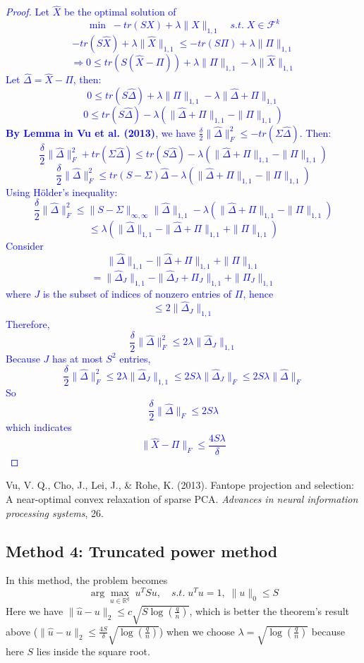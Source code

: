 \documentclass[12pt]{book}
\theoremstyle{definition}
\theoremstyle{remark}
\newcommand{\R}{\mathbb{R}}
\begin{document}
\textcolor{blue}{
\begin{proof}
    Let $\hat{X}$ be the optimal solution of 
    \[\min\; -tr(SX) + \lambda\|X\|_{1,1}\quad s.t. \; X\in \mathcal{F}^k\]
    \[
-tr(S\hat{X}) + \lambda \| \hat{X}\|_{1,1} \leq - tr(S\Pi) + \lambda \| \Pi \|_{1,1}
\]
\[
\Rightarrow 0 \leq tr(S(\hat{X} - \Pi)) + \lambda \| \Pi \|_{1,1} - \lambda \|\hat{X} \|_{1,1}
\]
Let \(\hat{\Delta} = \hat{X} - \Pi\), then:
\[
0 \leq tr(S\hat{\Delta}) + \lambda \| \Pi \|_{1,1} - \lambda \| \hat{\Delta} + \Pi \|_{1,1}
\]
\[
0 \leq tr(S\hat{\Delta}) - \lambda ( \| \hat{\Delta} + \Pi \|_{1,1} - \| \Pi \|_{1,1} )
\]
\textbf{By Lemma in Vu et al. (2013)}, we have $\frac{\delta}{2} \| \hat{\Delta} \|_F^2 \le -tr(\Sigma\hat{\Delta})$. Then:
\[
\frac{\delta}{2} \| \hat{\Delta} \|_F^2 + tr(\Sigma\hat{\Delta}) \leq tr(S\hat{\Delta}) - \lambda ( \| \hat{\Delta} + \Pi \|_{1,1} - \| \Pi \|_{1,1} )
\]
\[
\frac{\delta}{2} \| \hat{\Delta} \|_F^2 \leq tr(S - \Sigma) \hat{\Delta} - \lambda ( \| \hat{\Delta} + \Pi \|_{1,1} - \| \Pi \|_{1,1} )
\]
Using Hölder’s inequality:
\[
\frac{\delta}{2} \| \hat{\Delta} \|_F^2 \leq \| S - \Sigma \|_{\infty, \infty} \| \hat{\Delta} \|_{1,1} - \lambda ( \| \hat{\Delta} + \Pi \|_{1,1} - \| \Pi \|_{1,1} )
\]
\[
\leq \lambda( \| \hat{\Delta} \|_{1,1} - \| \hat{\Delta} + \Pi \|_{1,1} + \| \Pi \|_{1,1} )
\]
Consider
\[
\| \hat{\Delta} \|_{1,1} - \| \hat{\Delta} + \Pi \|_{1,1} + \| \Pi \|_{1,1} \]\[= \| \hat{\Delta}_J \|_{1,1} - \| \hat{\Delta}_J + \Pi_J \|_{1,1} + \| \Pi_J \|_{1,1}
\]
where \( J \) is the subset of indices of nonzero entries of \( \Pi \), hence
\[\le 2\| \hat{\Delta}_J \|_{1,1}\]
Therefore, 
\[\frac{\delta}{2} \| \hat{\Delta} \|_F^2 \le 2\lambda\| \hat{\Delta}_J \|_{1,1}\]
Because $J$ has at most $S^2$ entries,
\[\frac{\delta}{2} \| \hat{\Delta} \|_F^2 \le 2\lambda\| \hat{\Delta}_J \|_{1,1} \le 2S\lambda\| \hat{\Delta}_J \|_{F}\le 2S\lambda\| \hat{\Delta} \|_{F}\]
So \[\frac{\delta}{2} \| \hat{\Delta} \|_F \le 2S\lambda\]
which indicates \[\|\hat{X} - \Pi\|_F \le \frac{4S\lambda}{\delta}\]
\end{proof}
}

\begin{referencebox}
    Vu, V. Q., Cho, J., Lei, J., \& Rohe, K. (2013). Fantope projection and selection: A near-optimal convex relaxation of sparse PCA. \textit{Advances in neural information processing systems}, 26.
\end{referencebox}


\subsection{Method 4: Truncated power method}
In this method, the problem becomes 
\[\arg\underset{u\in\R^q}{\max} \;u^TSu, \quad s.t. \;u^Tu = 1, \;\|u\|_0 \le S\]
Here we have $\|\hat{u}-u\|_2 \le c\sqrt{S\log(\frac{q}{n})}$, which is better the theorem's result above ($\|\hat{u}-u\|_2 \le \frac{4S}{\delta}\sqrt{\log(\frac{q}{n})}$) when we choose $\lambda = \sqrt{\log(\frac{q}{n})}$ because here $S$ lies inside the square root. 
\end{document}
